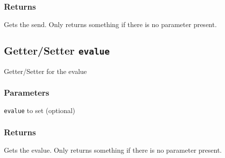 \subsubsection*{Returns\label{Returns}}


Gets the send. Only returns something if there is no parameter present.

\subsection*{Getter/Setter \texttt{evalue}\label{Getter_Setter_evalue}}


Getter/Setter for the evalue

\subsubsection*{Parameters\label{Parameters}}
\begin{description}

\item[{\texttt{evalue} to set (optional)}] \mbox{}\end{description}
\subsubsection*{Returns\label{Returns}}


Gets the evalue. Only returns something if there is no parameter present.
